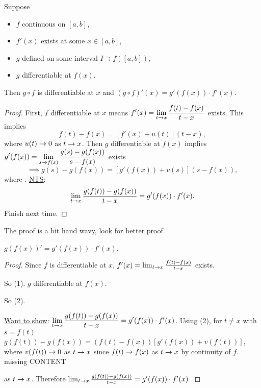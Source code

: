 \documentclass[]{article}
\begin{document}
\begin{theorem}
	\label{thm-5-5}
	Suppose
	\begin{itemize}
		\item $f$ continuous on $[a,b]$,
		\item $f'(x)$ exists at some $x\in[a,b]$,
		\item $g$ defined on some interval $I\supset f([a,b])$,
		\item $g$ differentiable at $f(x)$.
	\end{itemize}
	Then $g\circ f$ is differentiable at $x$ and $(g\circ f)'(x) = g'(f(x))\cdot f'(x)$.
\end{theorem}
\begin{proof}
	First, $f$ differentiable at $x$ means $\displaystyle f'(x) = \lim_{t\rightarrow x} \frac{f(t)-f(x)}{t-x}$ exists.
	This implies $$f(t)-f(x) = [f'(x) + u(t)](t-x),$$ where $u(t)\rightarrow0$ as $t\rightarrow x$.
	Then $g$ differentiable at $f(x)$ implies $\displaystyle g'(f(x)) = \lim_{s\rightarrow f(x)} \frac{g(s)-g(f(x))}{s-f(x)}$ exists $$\implies g(s)-g(f(x)) = [g'(f(x))+v(s)](s-f(x)),$$ where .
	\ul{\ul{NTS}}: $$\lim_{t\rightarrow x} \frac{g(f(t))-g(f(x))}{t-x} = g'(f(x))\cdot f'(x).$$
	Finish next time.
\end{proof}
\begin{remark}
	The proof is a bit hand wavy, look for better proof.
\end{remark}
\begin{recall}
	$g(f(x))' = g'(f(x))\cdot f'(x)$.
\end{recall}
\begin{proof}
	Since $f$ is differentiable at $x$, $f'(x)=\lim_{t\rightarrow x} \frac{f(t)-f(x)}{t-x}$ exists.
	
	So  (1).
	$g$ differentiable at $f(x)$.
	
	So  (2).

	\ul{Want to show}: $\displaystyle\lim_{t\rightarrow x}\frac{g(f(t))-g(f(x))}{t-x} = g'(f(x))\cdot f'(x)$.
	Using (2), for $t\neq x$ with $s=f(t)$
	$g(f(t)) - g(f(x)) = (f(t)-f(x))[g'(f(x))+v(f(t))]$, where $v(f(t))\rightarrow0$ as $t\rightarrow x$ since $f(t)\rightarrow f(x)$ as $t\rightarrow x$ by continuity of $f$.
	missing CONTENT
	\iffalse
	\begin{align*}
		g(f(t))-g(f(x))
		&\os{(1)}= (t-x)[f'(x)+u(t)][g'(f(x))+v(f(t))] \\
		&= \ub{\,}{f'(x)\cdot g'(f(x))}+f'(x)\cdot \ub{\ra0\text{ as }t\ra x}{v(f(t))} + \us{\ra0\text{as t\ra x}}{u(t)} g'(f(x)) + u(t)\us{\ra0}{v(f(t))} \ra g'(f(x))\cdot f'(x)
	\end{align*}
	\fi
	as $t\rightarrow x$.
	Therefore $\lim_{t\rightarrow x}\frac{g(f(t))-g(f(x))}{t-x} = g'(f(x))\cdot f'(x)$.
\end{proof}
\end{document}
